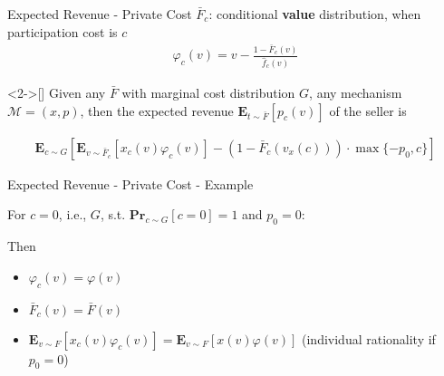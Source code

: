 \documentclass{beamer}
\begin{document}
\begin{frame}{Expected Revenue - Private Cost}
  $\bar{F}_c$: conditional \textbf{value} distribution, when participation cost is $c$
  \begin{align*}
    \varphi_c(v) = v - \frac{1- \bar{F}_c(v)}{\hat{f}_c(v)}
  \end{align*}

  \begin{theorem}<2->[\cite{primary}]
    Given any $\bar{F}$ with marginal cost distribution $G$, any mechanism $\mathcal{M}=(x,p)$, then the expected revenue $\mathbf{E}_{t \sim \bar{F}}\left[p_c(v)\right]$ of the seller is

    \begin{align*}
      \mathbf{E}_{c \sim G}\left[\mathbf{E}_{v\sim\bar{F}_c}\left[x_c(v)\varphi_c(v)\right] - (1-\bar{F}_c(v_x(c))) \cdot \max\{-p_0,c\}\right]
    \end{align*}
  \end{theorem}
\end{frame}

\begin{frame}{Expected Revenue - Private Cost - Example}
  \begin{example}
    For $c = 0$, i.e., $G$, s.t. $\mathbf{Pr}_{c \sim G}[c = 0] = 1$ and $p_0 = 0$:
  \end{example}

  Then
  \begin{itemize}
    \item<2-> $\varphi_c(v) = \varphi(v)$
    \item<3-> $\bar{F}_c(v) = \bar{F}(v)$
    \item<4-> $\mathbf{E}_{v \sim F}\left[x_c(v) \varphi_c(v)\right] = \mathbf{E}_{v \sim F}\left[x(v) \varphi(v)\right]$
      (individual rationality if $p_0 = 0$)
  \end{itemize}

\end{frame}
\end{document}
